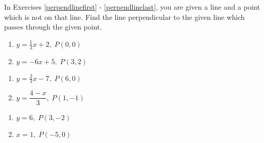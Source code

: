 \documentclass{ximera}
\begin{document}
\label{perpendicularlines}

In Exercises \ref{perpendlinefirst} - \ref{perpendlinelast}, you are given a line and a point which is not on that line.  Find the line perpendicular to the given line which passes through the given point.

\begin{multicols}{2}
\begin{enumerate}
\setcounter{enumi}{\value{HW}}


\item $y = \frac{1}{3}x + 2, \; P(0, 0)$ \label{perpendlinefirst}
\item $y = -6x + 5, \; P(3, 2)$

\setcounter{HW}{\value{enumi}}
\end{enumerate}
\end{multicols}

\begin{multicols}{2}
\begin{enumerate}
\setcounter{enumi}{\value{HW}}

\item $y = \frac{2}{3} x - 7, \; P(6, 0)$
\item $y = \dfrac{4-x}{3}, \; P(1, -1)$


\setcounter{HW}{\value{enumi}}
\end{enumerate}
\end{multicols}

\begin{multicols}{2}
\begin{enumerate}
\setcounter{enumi}{\value{HW}}

\item $y = 6, \; P(3, -2)$
\item $x=1, \; P(-5,0)$ \label{perpendlinelast}


\setcounter{HW}{\value{enumi}}
\end{enumerate}
\end{multicols}
\end{document}
